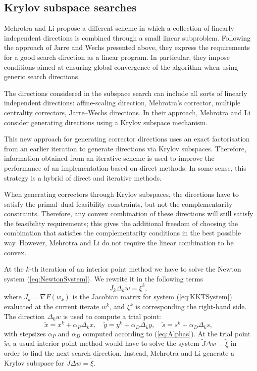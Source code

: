 %
%
\subsection{Krylov subspace searches}
\label{sec:MehrotraLi}

Mehrotra and Li \cite{MehrotraLi} propose a different 
scheme in which a collection of linearly 
independent directions is combined through a small linear subproblem.
Following the approach of Jarre and Wechs \cite{JarreWechs}
presented above,
they express the requirements for a good search direction as a linear 
program. In particular, they impose conditions aimed at ensuring 
global convergence of the algorithm when using generic search directions.

The directions considered in the subspace search can include all 
sorts of linearly independent directions: affine-scaling direction, 
Mehrotra's corrector, multiple centrality correctors, Jarre--Wechs 
directions. 
In their approach, Mehrotra and Li \cite{MehrotraLi}
consider generating directions using a Krylov subspace mechanism.

This new approach for generating corrector directions uses an exact 
factorisation from an earlier iteration to generate directions 
via Krylov subspaces. 
Therefore, information obtained from an iterative scheme is used 
to improve the performance of an implementation based on direct 
methods. In some sense, this strategy is a hybrid of direct 
and iterative methods.

When generating correctors through Krylov subspaces, the directions 
have to satisfy the primal--dual feasibility constraints, but not 
the complementarity constraints. Therefore, any convex combination 
of these directions will still satisfy the feasibility requirements; 
this gives the additional freedom of choosing the combination that 
satisfies the complementarity conditions in the best possible way. 
However, Mehrotra and Li \cite{MehrotraLi} do not require 
the linear combination to be convex.

At the $k$-th iteration of an interior point method we have to solve 
the Newton system (\ref{eq:NewtonSystem}).
We rewrite it in the following terms
\[
   J_k \Delta_k w = \xi^k, 
\]
where 
$J_k = \nabla F(w_k)$ is the Jacobian matrix for system
(\ref{eq:KKTSystem}) evaluated at the current iterate $w^k$,
and $\xi^k$ is corresponding the right-hand side.
%
The direction $\Delta_k w$ is used to compute a trial point:
\[
\tilde{x} = x^k + \alpha_P \Delta_k x, \quad
\tilde{y} = y^k + \alpha_D \Delta_k y, \quad
\tilde{s} = s^k + \alpha_D \Delta_k s,
\]
with stepsizes $\alpha_P$ and $\alpha_D$ computed according
to (\ref{eq:Alphas}).
At the trial point $\tilde w$, a usual 
interior point method would have to solve the system
$\tilde J \Delta w = \tilde \xi$
in order to find the next search direction. Instead, 
Mehrotra and Li \cite{MehrotraLi} generate a Krylov subspace 
for $\tilde J \Delta w = \tilde \xi$.

